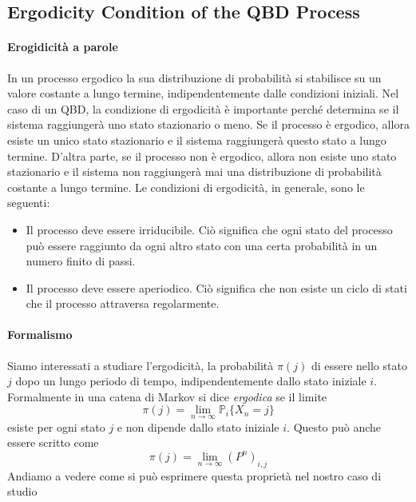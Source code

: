 \documentclass[11pt]{article}
\begin{document}
\subsection{Ergodicity Condition of the QBD Process}

\paragraph{Erogidicità a parole} In un processo ergodico la sua distribuzione di probabilità si stabilisce su un valore costante a lungo termine, indipendentemente dalle condizioni iniziali.
Nel caso di un QBD, la condizione di ergodicità è importante perché determina se il sistema raggiungerà uno stato stazionario o meno. Se il processo è ergodico, allora esiste un unico stato stazionario e il sistema raggiungerà questo stato a lungo termine. D'altra parte, se il processo non è ergodico, allora non esiste uno stato stazionario e il sistema non raggiungerà mai una distribuzione di probabilità costante a lungo termine. Le condizioni di ergodicità, in generale, sono le seguenti:
\begin{itemize}
    \item Il processo deve essere irriducibile. Ciò significa che ogni stato del processo può essere raggiunto da ogni altro stato con una certa probabilità in un numero finito di passi.
    \item Il processo deve essere aperiodico. Ciò significa che non esiste un ciclo di stati che il processo attraversa regolarmente.
\end{itemize}
\paragraph{Formalismo}  Siamo interessati a studiare l'ergodicità, la probabilità $\pi(j)$ di essere nello stato $j$ dopo un lungo periodo di tempo, indipendentemente dallo stato iniziale $i$. Formalmente in una catena di Markov si dice \emph{ergodica} se il limite
$$ \pi(j) = \lim_{n\to \infty} \mathbb{P}_i \{X_n = j\} $$
esiste per ogni stato $j$ e non dipende dallo stato iniziale $i$. Questo può anche essere scritto come
$$ \pi(j) = \lim_{n \to \infty} (P^n)_{i,j} $$
Andiamo a vedere come si può esprimere questa proprietà nel nostro caso di studio
\end{document}
